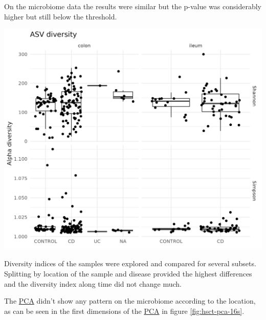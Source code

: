 \documentclass[
  12pt,
  a4paper,
  twoside,
  openright]{book}
\let\origfigure\figure
\let\endorigfigure\endfigure
\renewenvironment{figure}[1][2] {
    \expandafter\origfigure\expandafter[!htbp]
} {
    \endorigfigure
}
\begin{document}
On the microbiome data the results were similar but the p-value was considerably higher but still below the threshold.

\begin{figure}
\includegraphics[width=1\linewidth]{images/hsct-ASV-diversity} \caption[Microbiome diversity in the HSCT dataset.]{Microbiome diversity in the HSCT dataset. On the upper section the Shannon effective and on the lower row the Simpson effective diversity splitted by colon and ileum and controls and CD. There is high diversity between the samples on the same condition.}\label{fig:hsct-diversity}
\end{figure}

Diversity indices of the samples were explored and compared for several subsets.
Splitting by location of the sample and disease provided the highest differences and the diversity index along time did not change much.

The \protect\hyperlink{acronyms_PCA}{PCA} didn't show any pattern on the microbiome according to the location, as can be seen in the first dimensions of the \protect\hyperlink{acronyms_PCA}{PCA} in figure \ref{fig:hsct-pca-16s}.
\end{document}
